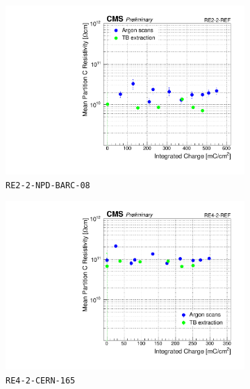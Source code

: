 \begin{figure}[H]
\begin{subfigure}{0.5\linewidth}
    		\includegraphics[width = \linewidth]{fig/chapt5/Extract-Res_vs_time_RE2-2-REF.pdf}
        	\caption{\label{fig:Resistivity-extract:C} \texttt{RE2-2-NPD-BARC-08}}
    	\end{subfigure}
    	\begin{subfigure}{0.5\linewidth}
			\centering
    		\includegraphics[width = \linewidth]{fig/chapt5/Extract-Res_vs_time_RE4-2-REF.pdf}
        	\caption{\label{fig:Resistivity-extract:D} \texttt{RE4-2-CERN-165}}
    	\end{subfigure}
		\caption{\label{fig:Resistivity-extract} }
	\end{figure}
	
